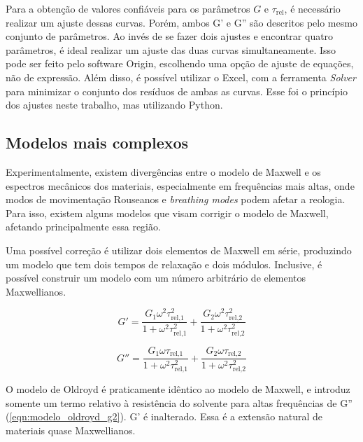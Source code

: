 			Para a obtenção de valores confiáveis para os parâmetros \(G\) e \(\tau_{\mathrm{rel}}\), é necessário realizar um ajuste dessas curvas. Porém, ambos G' e G'' são descritos pelo mesmo conjunto de parâmetros. Ao invés de se fazer dois ajustes e encontrar quatro parâmetros, é ideal realizar um ajuste das duas curvas simultaneamente. Isso pode ser feito pelo software Origin\textregistered, escolhendo uma opção de ajuste de equações, não de expressão. Além disso, é possível utilizar o Excel, com a ferramenta \emph{Solver} para minimizar o conjunto dos resíduos de ambas as curvas. Esse foi o princípio dos ajustes neste trabalho, mas utilizando Python.
			
			\subsection{Modelos mais complexos}
			\label{sec:modelos_complexos_reologia}
			Experimentalmente, existem divergências entre o modelo de Maxwell e os espectros mecânicos dos materiais, especialmente em frequências mais altas, onde modos de movimentação Rouseanos e \emph{breathing modes} podem afetar a reologia.\cite{Berret1993a} Para isso, existem alguns modelos que visam corrigir o modelo de Maxwell, afetando principalmente essa região.\cite{Garcia2018}
			
			Uma possível correção é utilizar dois elementos de Maxwell em série, produzindo um modelo que tem dois tempos de relaxação e dois módulos.\cite{Helgeson2010d} Inclusive, é possível construir um modelo com um número arbitrário de elementos Maxwellianos.\cite{Lyklema_rheology} 
			
			\begin{equation}
				G' = \dfrac{ G_1 \omega^2 \tau_{\textrm{rel,1}}^2   }{  1 + \omega^2 \tau_{\textrm{rel,1}}^2      } + \dfrac{ G_2 \omega^2 \tau_{\textrm{rel,2}}^2   }{  1 + \omega^2 \tau_{\textrm{rel,2}}^2      }
			\label{eqn:modelo_doismodos_g1}
			\end{equation}
		
			\begin{equation}
				G'' = \dfrac{  G_1 \omega  \tau_{\textrm{rel,1}}        }{ 1 + \omega^2 \tau_{\textrm{rel,1}}^2 } + \dfrac{  G_2 \omega  \tau_{\textrm{rel,2}}        }{ 1 + \omega^2 \tau_{\textrm{rel,2}}^2 }
			\label{eqn:modelo_doismodos_g2}
			\end{equation}

			O modelo de Oldroyd é praticamente idêntico ao modelo de Maxwell, e introduz somente um termo relativo à resistência do solvente para altas frequências de G'' (\autoref{eqn:modelo_oldroyd_g2}). G' é inalterado.\cite{Rehage1991, CalabreseTese} Essa é a extensão natural de materiais quase Maxwellianos.\cite{Giant_Micelles}
			
